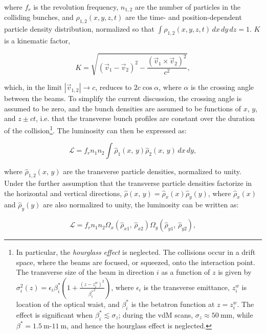 where $f_r$ is the revolution frequency, $n_{1,2}$ are the number of particles in the colliding bunches, and $\rho_{1,2}(x,y,z,t)$ are the time- and position-dependent particle density distribution, normalized so that $\int \rho_{1,2}(x,y,z,t)\,dx\,dy\,dz = 1$. $K$ is a kinematic factor,

\begin{equation}
	K=\sqrt{(\vec{v}_1-\vec{v}_2)^2 - \frac{(\vec{v}_1\times\vec{v}_2)^2}{c^2}},
\end{equation}

which, in the limit $|\vec{v}_{1,2}|\rightarrow c$, reduces to $2c\cos\alpha$, where $\alpha$ is the crossing angle between the beams. To simplify the current discussion, the crossing angle is assumed to be zero, and the bunch densities are assumed to be functions of $x$, $y$, and $z\pm ct$, i.e. that the transverse bunch profiles are constant over the duration of the collision\footnote{In particular, the \emph{hourglass effect} is neglected. The collisions occur in a drift space, where the beams are focused, or squeezed, onto the interaction point. The transverse size of the beam in direction $i$ as a function of $z$ is given by $\sigma_{i}^2(z)=\epsilon_{i} \beta^*_{i} \left(1+\frac{(z-z_{i}^w)^2}{{\beta^*_{i}}^2}\right)$, where $\epsilon_{i}$ is the transverse emittance, $z_i^w$ is location of the optical waist, and $\beta^*_i$ is the betatron function at $z=z_i^w$. The effect is significant when $\beta^*_i\lesssim \sigma_z$; during the vdM scans, $\sigma_z\approx \SI{50}{\milli\meter}$, while $\beta^*=\SI{1.5}{\meter}$-$\SI{11}{\meter}$, and hence the hourglass effect is neglected.}. The luminosity can then be expressed as:

\begin{equation}
	\mathcal{L}=f_r n_1 n_2 \int \hat{\rho}_1(x,\,y)\hat{\rho}_2(x,\,y)\, dx\,dy,
\end{equation}

where $\hat{\rho}_{1,2}(x,\,y)$ are the transverse particle densities, normalized to unity. Under the further assumption that the transverse particle densities factorize in the horizontal and vertical directions, $\hat{\rho}(x,\,y)=\hat{\rho}_x(x)\hat{\rho}_y(y)$, where $\hat{\rho}_x(x)$ and $\hat{\rho}_y(y)$ are also normalized to unity, the luminosity can be written as:

\begin{equation}
	\mathcal{L} = f_r n_1 n_2 \Omega_x(\hat{\rho}_{x1},\,\hat{\rho}_{x2}) \Omega_y(\hat{\rho}_{y1},\,\hat{\rho}_{y2}),
\end{equation}

